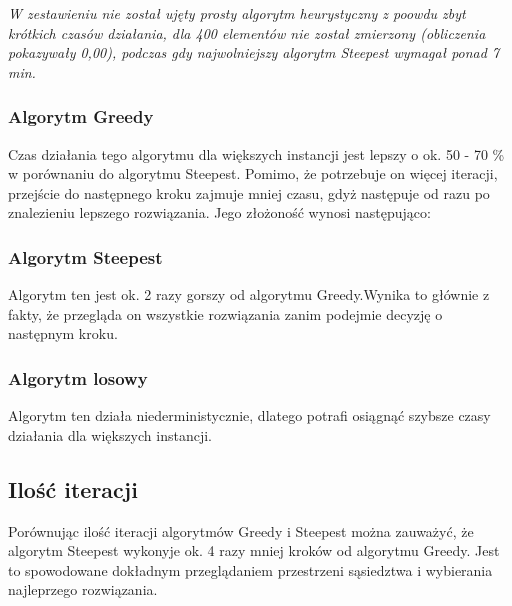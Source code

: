 \it
W zestawieniu nie został ujęty prosty algorytm heurystyczny z poowdu zbyt krótkich czasów 
działania, dla 400 elementów nie został zmierzony (obliczenia pokazywały 0,00), podczas 
gdy najwolniejszy algorytm Steepest wymagał ponad 7 min.
\rm

\subsubsection{Algorytm Greedy}

Czas działania tego algorytmu dla większych instancji jest lepszy o ok. 50 - 70 \% w porównaniu 
do algorytmu Steepest. Pomimo, że potrzebuje on więcej iteracji, przejście do następnego kroku 
zajmuje mniej czasu, gdyż następuje od razu po znalezieniu lepszego rozwiązania. Jego złożoność 
wynosi następująco:

\subsubsection{Algorytm Steepest}

Algorytm ten jest ok. 2 razy gorszy od algorytmu Greedy.Wynika to głównie z fakty, że przegląda on
wszystkie rozwiązania zanim podejmie decyzję o następnym kroku. 

\subsubsection{Algorytm losowy}

Algorytm ten działa niederministycznie, dlatego potrafi osiągnąć szybsze czasy działania dla 
większych instancji. 

\subsection{Ilość iteracji}

Porównując ilość iteracji algorytmów Greedy i Steepest można zauważyć, że algorytm 
Steepest wykonyje ok. 4 razy mniej kroków od algorytmu Greedy. Jest to spowodowane 
dokładnym przeglądaniem przestrzeni sąsiedztwa i wybierania najleprzego rozwiązania.
